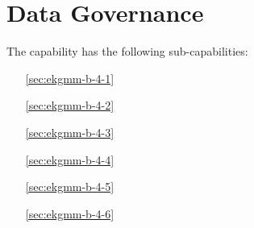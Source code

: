 \chapter{Data Governance}\label{ch:ekgmm-b-4} %

The \currentname capability has the following sub-capabilities:

\begin{itemize}[leftmargin=.5in]
  \item [\ref{sec:ekgmm-b-4-1}] 
  \item [\ref{sec:ekgmm-b-4-2}] 
  \item [\ref{sec:ekgmm-b-4-3}] 
  \item [\ref{sec:ekgmm-b-4-4}] 
  \item [\ref{sec:ekgmm-b-4-5}] 
  \item [\ref{sec:ekgmm-b-4-6}] 
\end{itemize}







